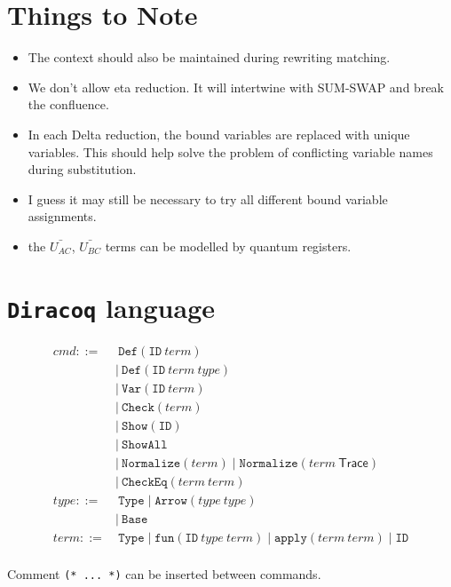 \documentclass[runningheads]{llncs}
\begin{document}
\section{Things to Note}
\begin{itemize}
    \item The context should also be maintained during rewriting matching.
    \item We don't allow eta reduction. It will intertwine with SUM-SWAP and break the confluence.
    \item In each Delta reduction, the bound variables are replaced with unique variables. This should help solve the problem of conflicting variable names during substitution.
    \item I guess it may still be necessary to try all different bound variable assignments.
    \item the $\bar{U_{AC}}$, $\bar{U_{BC}}$ terms can be modelled by quantum registers.
\end{itemize}


\section{\texttt{Diracoq} language}

\begin{align*}
    cmd ::=&\ \texttt{Def}(\texttt{ID}\ term) \\
        &|\ \texttt{Def}(\texttt{ID}\ term\ type) \\
        &|\ \texttt{Var}(\texttt{ID}\ term) \\
        &|\ \texttt{Check}(term) \\
        &|\ \texttt{Show}(\texttt{ID}) \\
        &|\ \texttt{ShowAll} \\
        &|\ \texttt{Normalize}(term) \mid \texttt{Normalize}(term\ \textsf{Trace}) \\
        &|\ \texttt{CheckEq}(term\ term) \\
    type ::=&\ \texttt{Type} \mid \texttt{Arrow}(type\ type) \\
            &|\ \texttt{Base} \\
    term ::=&\ \texttt{Type} \mid \texttt{fun}(\texttt{ID}\ type\ term) \mid \texttt{apply}(term\ term) \mid \texttt{ID} \\
\end{align*}

Comment \texttt{(* ... *)} can be inserted between commands.
\end{document}
